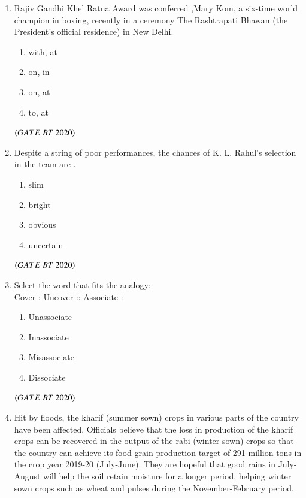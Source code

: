 \documentclass[journal,12pt,onecolumn]{IEEEtran}
\theoremstyle{remark}
\begin{document}
\begin{enumerate}[label=Q\arabic*:]

\item Rajiv Gandhi Khel Ratna Award was conferred   ,Mary Kom, a six-time world champion in boxing, recently in a ceremony      The Rashtrapati Bhawan (the President's official residence) in New Delhi.

\begin{multicols}{2}
\begin{enumerate}

\item with, at
\item on, in
\item on, at 
\item to, at  

\end{enumerate}
\end{multicols}\hfill$\left(GATE\ BT\ 2020\right)$

\item Despite a string of poor performances, the chances of K. L. Rahul's selection in the team are .

\begin{multicols}{4}
\begin{enumerate}
\item slim
\item bright
\item obvious
\item uncertain 

\end{enumerate}
\end{multicols}
\hfill$\left(GATE\ BT\ 2020\right)$

\item Select the word that fits the analogy: \\
Cover : Uncover :: Associate : 

\begin{multicols}{4}
\begin{enumerate}

\item Unassociate
\item Inassociate
\item Misassociate
\item Dissociate 

\end{enumerate}
\end{multicols}\hfill$\left(GATE\ BT\ 2020\right)$

\item Hit by floods, the kharif (summer sown) crops in various parts of the country have been affected. Officials believe that the loss in production of the kharif crops can be recovered in the output of the rabi (winter sown) crops so that the country can achieve its food-grain production target of 291 million tons in the crop year 2019-20 (July-June). They are hopeful that good rains in July-August will help the soil retain moisture for a longer period, helping winter sown crops such as wheat and pulses during the November-February period.\\


\end{enumerate}
\end{document}
